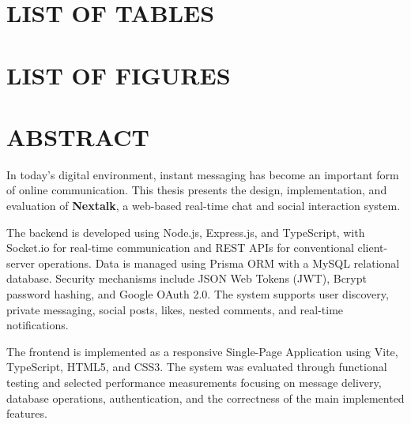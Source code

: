 \documentclass[12pt, a4paper]{article}
\begin{document}
\newpage


\section*{LIST OF TABLES}

\listoftables

\newpage


\section*{LIST OF FIGURES}

\listoffigures

\newpage

\section*{ABSTRACT}

In today's digital environment, instant messaging has become an important form of online communication. This thesis presents the design, implementation, and evaluation of \textbf{Nextalk}, a web-based real-time chat and social interaction system.

The backend is developed using Node.js, Express.js, and TypeScript, with Socket.io for real-time communication and REST APIs for conventional client-server operations. Data is managed using Prisma ORM with a MySQL relational database. Security mechanisms include JSON Web Tokens (JWT), Bcrypt password hashing, and Google OAuth 2.0. The system supports user discovery, private messaging, social posts, likes, nested comments, and real-time notifications.

The frontend is implemented as a responsive Single-Page Application using Vite, TypeScript, HTML5, and CSS3. The system was evaluated through functional testing and selected performance measurements focusing on message delivery, database operations, authentication, and the correctness of the main implemented features.
\end{document}
